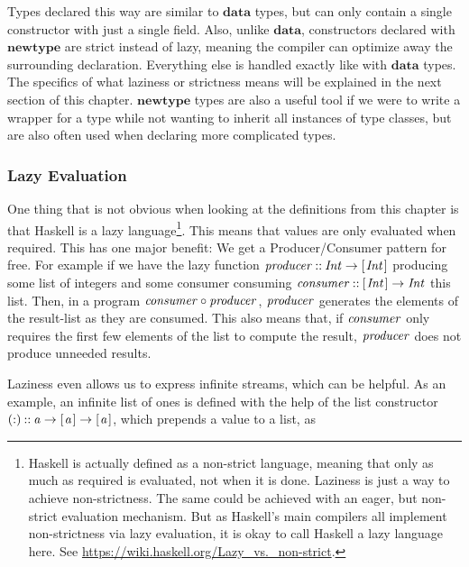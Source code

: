 \documentclass[paper=A4,twoside=true,openright,parskip=full,chapterprefix=true,headings=normal,bibliography=totoc,listof=totoc,titlepage=on,captions=tableabove,draft=false,british]{scrreprt}%
\begin{document}
Types declared this way are similar to \ensuremath{\mathbf{data}} types, but can only
contain a single constructor with just a single field. Also, unlike
\ensuremath{\mathbf{data}}, constructors declared with \ensuremath{\mathbf{newtype}} are strict instead of lazy,
meaning the compiler can optimize away the surrounding declaration.
Everything else is handled exactly like with \ensuremath{\mathbf{data}} types. The specifics
of what laziness or strictness means will be explained in the next
section of this chapter. \ensuremath{\mathbf{newtype}} types are also a useful tool if we
were to write a wrapper for a type while not wanting to inherit all
instances of type classes, but are also often used when declaring more
complicated types.

\hypertarget{lazy-evaluation}{%
\subsubsection{Lazy Evaluation}\label{lazy-evaluation}}

One thing that is not obvious when looking at the definitions from this
chapter is that Haskell is a lazy language\footnote{Haskell is actually
  defined as a non-strict language, meaning that only as much as
  required is evaluated, not when it is done. Laziness is just a way to
  achieve non-strictness. The same could be achieved with an eager, but
  non-strict evaluation mechanism. But as Haskell's main compilers all
  implement non-strictness via lazy evaluation, it is okay to call
  Haskell a lazy language here. See
  \url{https://wiki.haskell.org/Lazy_vs._non-strict}.}. This means that
values are only evaluated when required. This has one major benefit: We
get a Producer/Consumer pattern for free. For example if we have the
lazy function \ensuremath{\Varid{producer}\mathbin{::}\Conid{Int}\to [\mskip1.5mu \Conid{Int}\mskip1.5mu]} producing some list of integers
and some consumer consuming \ensuremath{\Varid{consumer}\mathbin{::}[\mskip1.5mu \Conid{Int}\mskip1.5mu]\to \Conid{Int}} this list. Then,
in a program \ensuremath{\Varid{consumer}\mathbin{\circ}\Varid{producer}}, \ensuremath{\Varid{producer}} generates the elements of
the result-list as they are consumed. This also means that, if
\ensuremath{\Varid{consumer}} only requires the first few elements of the list to compute
the result, \ensuremath{\Varid{producer}} does not produce unneeded results.

Laziness even allows us to express infinite streams, which can be
helpful. As an example, an infinite list of ones is defined with the
help of the list constructor \ensuremath{(\mathbin{:})\mathbin{::}\Varid{a}\to [\mskip1.5mu \Varid{a}\mskip1.5mu]\to [\mskip1.5mu \Varid{a}\mskip1.5mu]}, which prepends a
value to a list, as
\end{document}
